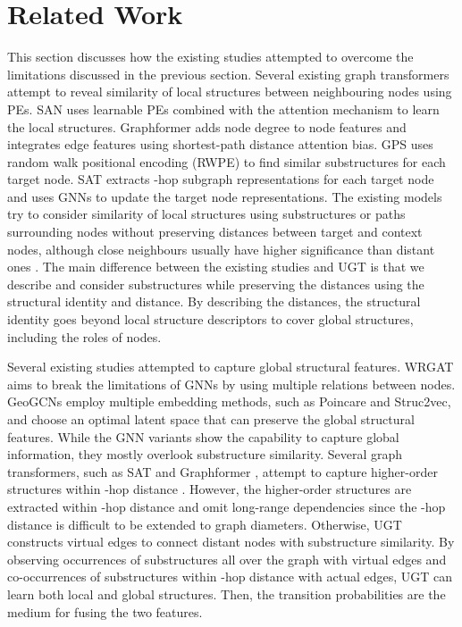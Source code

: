 \documentclass[oneside]{article}
\begin{document}
\section{Related Work}









This section discusses how the existing studies attempted to overcome the limitations discussed in the previous section. 
Several existing graph transformers attempt to reveal similarity of local structures between neighbouring nodes using PEs. 
SAN \cite{DBLP:conf/nips/KreuzerBHLT21} uses learnable PEs combined with the attention mechanism to learn the local structures. 
Graphformer \cite{DBLP:conf/nips/YingCLZKHSL21} adds node degree to node features and integrates edge features using shortest-path distance attention bias.
GPS \cite{DBLP:conf/nips/RampasekGDLWB22} uses random walk positional encoding (RWPE) to find similar substructures for each target node.
SAT \cite{DBLP:conf/icml/ChenOB22} extracts -hop subgraph representations for each target node and uses GNNs to update the target node representations. 
The existing models try to consider similarity of local structures using substructures or paths surrounding nodes without preserving distances between target and context nodes, although close neighbours usually have higher significance than distant ones \cite{DBLP:journals/mis/LeeHK21,DBLP:journals/joi/LeeJJ21}. 
The main difference between the existing studies and UGT is that we describe and consider substructures while preserving the distances using the structural identity and distance. 
By describing the distances, the structural identity goes beyond local structure descriptors to cover global structures, including the roles of nodes.



Several existing studies attempted to capture global structural features.
WRGAT \cite{DBLP:conf/kdd/SureshBNLM21} aims to break the limitations of GNNs by using multiple relations between nodes.
GeoGCNs \cite{DBLP:conf/iclr/PeiWCLY20} employ multiple embedding methods, such as Poincare and Struc2vec, and choose an optimal latent space that can preserve the global structural features. 
While the GNN variants show the capability to capture global information, they mostly overlook substructure similarity.
Several graph transformers, such as SAT \cite{DBLP:conf/icml/ChenOB22} and Graphformer \cite{DBLP:conf/nips/YingCLZKHSL21}, attempt to capture higher-order structures within -hop distance \cite{nguyen2023connector}.
However, the higher-order structures are extracted within -hop distance and omit long-range dependencies since the -hop distance is difficult to be extended to graph diameters. 
Otherwise, UGT constructs virtual edges to connect distant nodes with substructure similarity. 
By observing occurrences of substructures all over the graph with virtual edges and co-occurrences of substructures within -hop distance with actual edges, UGT can learn both local and global structures. 
Then, the transition probabilities are the medium for fusing the two features.
\end{document}

